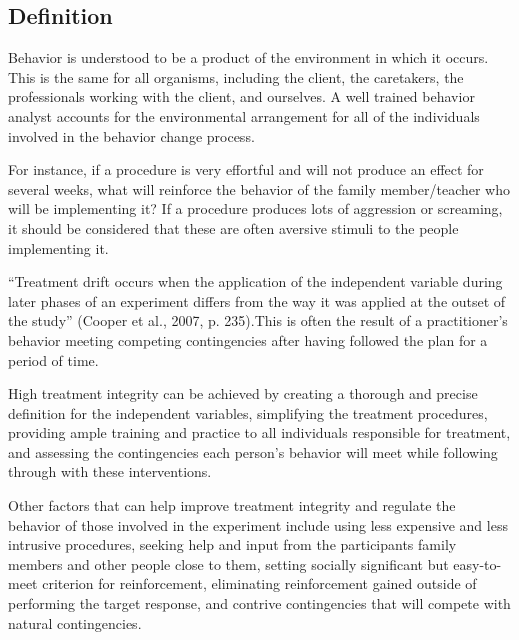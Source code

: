 \subsection{Definition}
Behavior is understood to be a product of the environment in which it occurs. This is the same for all organisms, including the client, the caretakers, the professionals working with the client, and ourselves. A well trained behavior analyst accounts for the environmental arrangement for all of the individuals involved in the behavior change process. 

For instance, if a procedure is very effortful and will not produce an effect for several weeks, what will reinforce the behavior of the family member/teacher who will be implementing it? If a procedure produces lots of aggression or screaming, it should be considered that these are often aversive stimuli to the people implementing it.

``Treatment drift occurs when the application of the independent variable during later phases of an experiment differs from the way it was applied at the outset of the study'' (Cooper et al., 2007, p. 235).This is often the result of a practitioner's behavior meeting competing contingencies after having followed the plan for a period of time.

High treatment integrity can be achieved by creating a thorough and precise definition for the independent variables, simplifying the treatment procedures, providing ample training and practice to all individuals responsible for treatment, and assessing the contingencies each person's behavior will meet while following through with these interventions. 

Other factors that can help improve treatment integrity and regulate the behavior of those involved in the experiment include using less expensive and less intrusive procedures, seeking help and input from the participants family members and other people close to them, setting socially significant but easy-to-meet criterion for reinforcement, eliminating reinforcement gained outside of performing the target response, and contrive contingencies that will compete with natural contingencies. 
%
